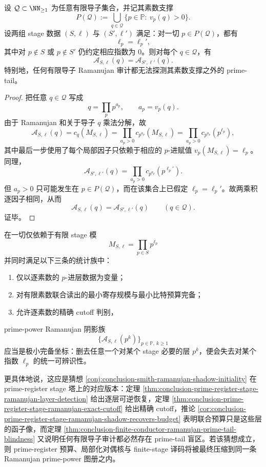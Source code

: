 \begin{theorem}\label{thm:conclusion-finite-conductor-ramanujan-prime-tail-blindness}
设 \(\mathcal Q\subset \NN_{\ge 1}\) 为任意有限导子集合，并记其素数支撑
\[
P(\mathcal Q):=\bigcup_{q\in\mathcal Q}\{p\in\mathbb P:\ v_p(q)>0\}.
\]
设两组 stage 数据 \((S,\boldsymbol\ell)\) 与 \((S',\boldsymbol\ell')\) 满足：对一切 \(p\in P(\mathcal Q)\)，都有
\[
\ell_p=\ell_p',
\]
其中对 \(p\notin S\) 或 \(p\notin S'\) 仍约定相应指数为 \(0\)。则对每个 \(q\in\mathcal Q\)，有
\[
\mathcal A_{S,\boldsymbol\ell}(q)=\mathcal A_{S',\boldsymbol\ell'}(q).
\]
特别地，任何有限导子 Ramanujan 审计都无法探测其素数支撑之外的 prime-tail。
\end{theorem}
\begin{proof}
把任意 \(q\in\mathcal Q\) 写成
\[
q=\prod_{p}p^{a_p},
\qquad
a_p=v_p(q).
\]
由于 Ramanujan 和关于导子 \(q\) 乘法分解，故
\[
\mathcal A_{S,\boldsymbol\ell}(q)
=
c_q(M_{S,\boldsymbol\ell})
=
\prod_{a_p>0}c_{p^{a_p}}(M_{S,\boldsymbol\ell})
=
\prod_{a_p>0}c_{p^{a_p}}(p^{\ell_p}),
\]
其中最后一步使用了每个局部因子只依赖于相应的 \(p\)-进赋值 \(v_p(M_{S,\boldsymbol\ell})=\ell_p\)。同理，
\[
\mathcal A_{S',\boldsymbol\ell'}(q)
=
\prod_{a_p>0}c_{p^{a_p}}(p^{\ell_p'}).
\]
但 \(a_p>0\) 只可能发生在 \(p\in P(\mathcal Q)\)，而在该集合上已假定 \(\ell_p=\ell_p'\)。故两乘积逐因子相同，从而
\[
\mathcal A_{S,\boldsymbol\ell}(q)=\mathcal A_{S',\boldsymbol\ell'}(q)
\qquad (q\in\mathcal Q).
\]
证毕。
\end{proof}

\begin{conjecture}\label{conj:conclusion-prime-register-ramanujan-shadow-minimal-completeness}
在一切仅依赖于有限 stage 模
\[
M_{S,\boldsymbol\ell}=\prod_{p\in S}p^{\ell_p}
\]
并同时满足以下三条的统计族中：
\begin{enumerate}
  \item 仅以逐素数的 \(p\)-进层数据为变量；
  \item 对有限素数联合读出的最小寄存规模与最小比特预算完备；
  \item 允许逐素数的精确 cutoff 判别，
\end{enumerate}
prime-power Ramanujan 阴影族
\[
\bigl\{\mathcal A_{S,\boldsymbol\ell}(p^k)\bigr\}_{p\in\mathbb P,\ k\ge 1}
\]
应当是极小完备坐标：删去任意一个对某个 stage 必要的层 \(p^k\)，便会失去对某个指数 \(\ell_p\) 的统一可辨识性。

更具体地说，这应是猜想 \ref{conj:conclusion-smith-ramanujan-shadow-initiality} 在 prime-register stage 塔上的对应版本：定理 \ref{thm:conclusion-prime-register-stage-ramanujan-layer-detection} 给出逐层可逆恢复，定理 \ref{thm:conclusion-prime-register-stage-ramanujan-exact-cutoff} 给出精确 cutoff，推论 \ref{cor:conclusion-prime-register-stage-ramanujan-shadow-recovers-budget} 表明联合预算只是这些层的函子像，而定理 \ref{thm:conclusion-finite-conductor-ramanujan-prime-tail-blindness} 又说明任何有限导子审计都必然存在 prime-tail 盲区。若该猜想成立，则 prime-register 预算、局部化对偶核与 finite-stage 译码将被最终压缩到同一条 Ramanujan prime-power 图册之内。
\end{conjecture}

